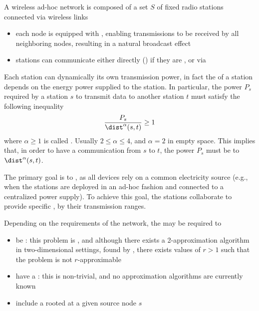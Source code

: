 \documentclass[a4paper, 12pt]{report}
\begin{document}
    A wireless ad-hoc network is composed of a set $S$ of fixed radio stations connected via wireless links

    \begin{itemize}
        \item each node is equipped with , enabling transmissions to be received by all neighboring nodes, resulting in a natural broadcast effect
        \item stations can communicate either directly () if they are , or via 
    \end{itemize}

    Each station can dynamically  its own transmission power, in fact the  of a station depends on the energy power supplied to the station. In particular, the power $P_s$ required by a station $s$ to transmit data to another station $t$ must satisfy the following inequality $$\dfrac{P_s}{\dist^\alpha(s, t) } \ge 1$$ where $\alpha \ge 1$ is called . Usually $2 \le \alpha \le 4$, and $\alpha = 2$ in empty space. This implies that, in order to have a communication from $s$ to $t$, the power $P_s$ must be  to $\dist^\alpha(s, t)$. 

    The primary goal is to , as all devices rely on a common electricity source (e.g., when the stations are deployed in an ad-hoc fashion and connected to a centralized power supply). To achieve this goal, the stations collaborate to provide specific , by  their transmission ranges.

    Depending on the requirements of the network, the  may be required to

    \begin{itemize}
        \item be : this problem is \NPHard, and although there exists a 2-approximation algorithm in two-dimensional settings, found by \textcite{kirousis}, there exists values of $r > 1$ such that the problem is not $r$-approximable
        \item have a : this is non-trivial, and no approximation algorithms are currently known
        \item include a  rooted at a given source node $s$
    \end{itemize}
\end{document}
